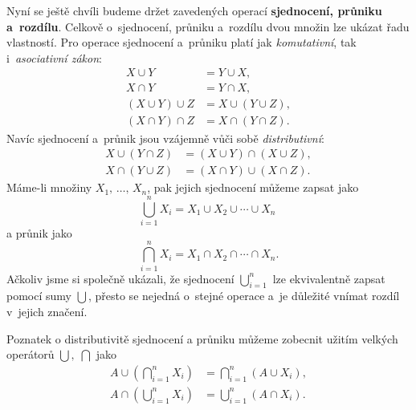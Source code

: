 Nyní se ještě chvíli budeme držet zavedených operací \textbf{sjednocení, průniku a~rozdílu}. Celkově o~sjednocení, průniku a~rozdílu dvou množin lze ukázat řadu vlastností. Pro operace sjednocení a~průniku platí jak \emph{komutativní}, tak i~\emph{asociativní zákon}:
\begin{align*}
    X \cup Y&=Y \cup X,\\
    X \cap Y&=Y \cap X,\\
    (X \cup Y) \cup Z &= X \cup (Y \cup Z),\\
    (X \cap Y) \cap Z &= X \cap (Y \cap Z).
\end{align*}
Navíc sjednocení a~průnik jsou vzájemně vůči sobě \emph{distributivní}:
\begin{align*}
    X \cup (Y \cap Z) &= (X \cup Y) \cap (X \cup Z),\\
    X \cap (Y \cup Z) &= (X \cap Y) \cup (X \cap Z).
\end{align*}
Máme-li množiny $X_1,\,\dots,\,X_n$, pak jejich sjednocení můžeme zapsat jako
\begin{equation*}
    \bigcup\limits_{i=1}^{n}{X_i}=X_1 \cup X_2 \cup \cdots \cup X_n\;
\end{equation*}
a průnik jako
\begin{equation*}
    \bigcap\limits_{i=1}^{n}{X_i}=X_1 \cap X_2 \cap \cdots \cap X_n.
\end{equation*}
Ačkoliv jsme si společně ukázali, že sjednocení $\bigcup_{i=1}^{n}$ lze ekvivalentně zapsat pomocí sumy $\bigcup$, přesto se nejedná o~stejné operace a~je důležité vnímat rozdíl v~jejich značení.\par
Poznatek o distributivitě sjednocení a průniku můžeme zobecnit užitím velkých operátorů $\bigcup,\;\bigcap$ jako
\begin{align*}
    A \cup \left(\bigcap\limits_{i=1}^{n}{X_i}\right)&=\bigcap\limits_{i=1}^{n}{(A \cup X_i)},\\
    A \cap \left(\bigcup\limits_{i=1}^{n}{X_i}\right)&=\bigcup\limits_{i=1}^{n}{(A \cap X_i)}.
\end{align*}